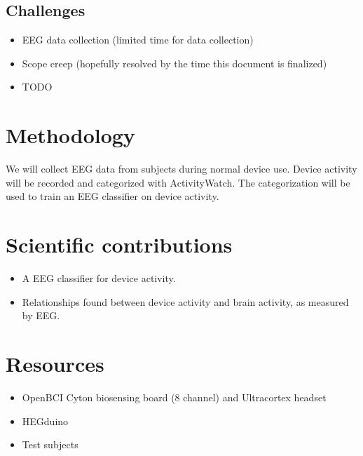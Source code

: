 \documentclass{IEEEtran}
\begin{document}
\subsection{Challenges}

\begin{itemize}
    \item EEG data collection (limited time for data collection)
    \item Scope creep (hopefully resolved by the time this document is finalized)
    \item TODO
\end{itemize}

\section{Methodology}

We will collect EEG data from subjects during normal device use. Device activity will be recorded and categorized with ActivityWatch. The categorization will be used to train an EEG classifier on device activity.

\section{Scientific contributions}

\begin{itemize}
  \item A EEG classifier for device activity.
  \item Relationships found between device activity and brain activity, as measured by EEG\@.
\end{itemize}


\section{Resources}

\begin{itemize}
  \item OpenBCI Cyton biosensing board (8 channel) and Ultracortex headset
  \item HEGduino
  \item Test subjects
\end{itemize}

\bibbysegment{}

\nocite{*}
  {\list{}
     {\setlength{\leftmargin}{\bibhang}%
      \setlength{\itemindent}{-\leftmargin}%
      \setlength{\itemsep}{\bibitemsep}%
      \setlength{\parsep}{\bibparsep}}
  }
  {\endlist}
  {\item}
\printbibliography[notcategory=cited, env=bibnonum, heading=notcited]
\end{document}
